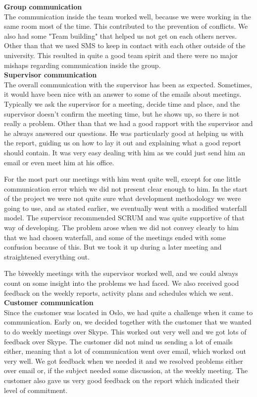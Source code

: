 
\indent \indent \textbf{Group communication} \\
The communication inside the team worked well, because we were working in the same room most of the time. This contributed to the prevention of conflicts. We also had some "Team building" that helped us not get on each others nerves. Other than that we used SMS to keep in contact with each other outside of the university. This resulted in quite a good team spirit and there were no major mishaps regarding communication inside the group.
\\

\textbf{Supervisor communication} \\
The overall communication with the supervisor has been as expected. Sometimes, it would have been nice with an answer to some of the emails about meetings. Typically we ask the supervisor for a meeting, decide time and place, and the supervisor doesn't confirm the meeting time, but he shows up, so there is not really a problem. Other than that we had a good rapport with the supervisor and he always answered our questions. He was particularly good at helping us with the report, guiding us on how to lay it out and explaining what a good report should contain. It was very easy dealing with him as we could just send him an email or even meet him at his office.

For the most part our meetings with him went quite well, except for one little communication error which we did not present clear enough to him. In the start of the project we were not quite sure what development methodology we were going to use, and as stated earlier, we eventually went with a modified waterfall model. The supervisor recommended SCRUM and was quite supportive of that way of developing. The problem arose when we did not convey clearly to him that we had chosen waterfall, and some of the meetings ended with some confusion because of this. But we took it up during a later meeting and straightened everything out.

The biweekly meetings with the supervisor worked well, and we could always count on some insight into the problems we had faced. We also received good feedback on the weekly reports, activity plans and schedules which we sent.
\\ 

\textbf{Customer communication} \\
Since the customer was located in Oslo, we had quite a challenge when it came to communication. Early on, we decided together with the customer that we wanted to do weekly meetings over Skype. This worked out very well and we got lots of feedback over Skype. The customer did not mind us sending a lot of emails either, meaning that a lot of communication went over email, which worked out very well. We got feedback when we needed it and we resolved problems either over email or, if the subject needed some discussion, at the weekly meeting. The customer also gave us very good feedback on the report which indicated their level of commitment. 

